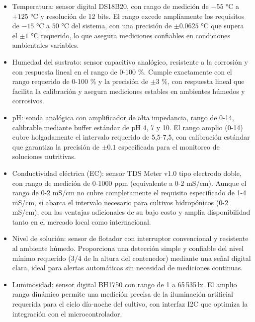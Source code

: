\begin{itemize}
    \item Temperatura: sensor digital DS18B20, con rango de medición de $-55$ °C a $+125$ °C y resolución de 12 bits. El rango excede ampliamente los requisitos de $-15$ °C a $50$ °C del sistema, con una precisión de $\pm 0.0625$ °C que supera el $\pm 1$ °C requerido, lo que asegura mediciones confiables en condiciones ambientales variables.

    \item Humedad del sustrato: sensor capacitivo analógico, resistente a la corrosión y con respuesta lineal en el rango de 0-100 \%. Cumple exactamente con el rango requerido de 0-100 \% y la precisión de $\pm 3$ \%, con respuesta lineal que facilita la calibración y asegura mediciones estables en ambientes húmedos y corrosivos.

    \item pH: sonda analógica con amplificador de alta impedancia, rango de 0-14, calibrable mediante buffer estándar de pH 4, 7 y 10. El rango amplio (0-14) cubre holgadamente el intervalo requerido de 5,5-7,5, con calibración estándar que garantiza la precisión de $\pm 0.1$ especificada para el monitoreo de soluciones nutritivas.

    \item Conductividad eléctrica (EC): sensor TDS Meter v1.0 tipo electrodo doble, con rango de medición de 0-1000 ppm (equivalente a 0-2 mS/cm). Aunque el rango de 0-2 mS/cm no cubre completamente el requisito especificado de 1-4 mS/cm, sí abarca el intervalo necesario para cultivos hidropónicos (0-2 mS/cm), con las ventajas adicionales de su bajo costo y amplia disponibilidad tanto en el mercado local como internacional.

    \item Nivel de solución: sensor de flotador con interruptor convencional y resistente al ambiente húmedo. Proporciona una detección simple y confiable del nivel mínimo requerido (3/4 de la altura del contenedor) mediante una señal digital clara, ideal para alertas automáticas sin necesidad de mediciones continuas.

    \item Luminosidad: sensor digital BH1750 con rango de 1 a 65\,535\,lx. El amplio rango dinámico permite una medición precisa de la iluminación artificial requerida para el ciclo día-noche del cultivo, con interfaz I2C que optimiza la integración con el microcontrolador.
\end{itemize}

